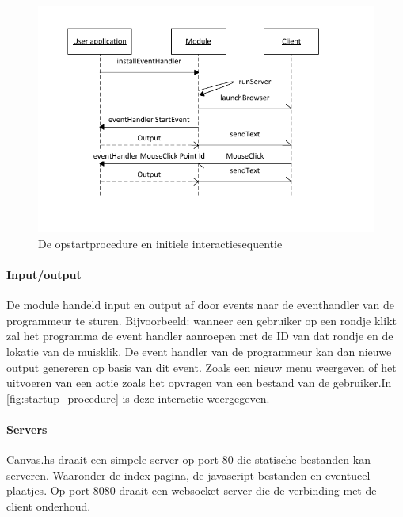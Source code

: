 \begin{figure}
\begin{center}
\includegraphics[keepaspectratio,width=\textwidth]{./images/module_startup_procedure_interaction.pdf}
\caption{De opstartprocedure en initiele interactiesequentie}
\label{fig:startup_procedure}
\end{center}
\end{figure}


\paragraph{Input/output}
De module handeld input en output af door events naar de eventhandler van de programmeur te sturen. Bijvoorbeeld: wanneer een gebruiker op een rondje klikt zal het programma de event handler aanroepen met de ID van dat rondje en de lokatie van de muisklik. De event handler van de programmeur kan dan nieuwe output genereren op basis van dit event. Zoals een nieuw menu weergeven of het uitvoeren van een actie zoals het opvragen van een bestand van de gebruiker.In \autoref{fig:startup_procedure} is deze interactie weergegeven. 

\paragraph{Servers}
Canvas.hs draait een simpele server op port 80 die statische bestanden kan serveren. Waaronder de index pagina, de javascript bestanden en eventueel plaatjes. Op port 8080 draait een websocket server die de verbinding met de client onderhoud.


